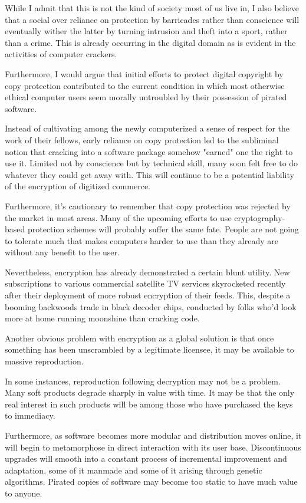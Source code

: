\documentclass[
]{article}
\begin{document}
While I admit that this is not the kind of society most of us live in, I
also believe that a social over reliance on protection by barricades
rather than conscience will eventually wither the latter by turning
intrusion and theft into a sport, rather than a crime. This is already
occurring in the digital domain as is evident in the activities of
computer crackers.

Furthermore, I would argue that initial efforts to protect digital
copyright by copy protection contributed to the current condition in
which most otherwise ethical computer users seem morally untroubled by
their possession of pirated software.

Instead of cultivating among the newly computerized a sense of respect
for the work of their fellows, early reliance on copy protection led to
the subliminal notion that cracking into a software package somehow
"earned" one the right to use it. Limited not by conscience but by
technical skill, many soon felt free to do whatever they could get away
with. This will continue to be a potential liability of the encryption
of digitized commerce.

Furthermore, it's cautionary to remember that copy protection was
rejected by the market in most areas. Many of the upcoming efforts to
use cryptography-based protection schemes will probably suffer the same
fate. People are not going to tolerate much that makes computers harder
to use than they already are without any benefit to the user.

Nevertheless, encryption has already demonstrated a certain blunt
utility. New subscriptions to various commercial satellite TV services
skyrocketed recently after their deployment of more robust encryption of
their feeds. This, despite a booming backwoods trade in black decoder
chips, conducted by folks who'd look more at home running moonshine than
cracking code.

Another obvious problem with encryption as a global solution is that
once something has been unscrambled by a legitimate licensee, it may be
available to massive reproduction.

In some instances, reproduction following decryption may not be a
problem. Many soft products degrade sharply in value with time. It may
be that the only real interest in such products will be among those who
have purchased the keys to immediacy.

Furthermore, as software becomes more modular and distribution moves
online, it will begin to metamorphose in direct interaction with its
user base. Discontinuous upgrades will smooth into a constant process of
incremental improvement and adaptation, some of it manmade and some of
it arising through genetic algorithms. Pirated copies of software may
become too static to have much value to anyone.
\end{document}
